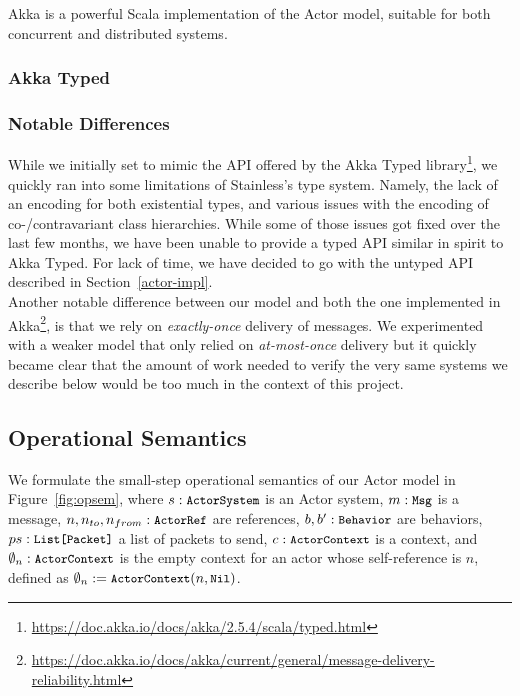 \documentclass[a4paper,twoside]{article}
\newcommand{\RefSec}[1]{Section~\ref{#1}}
\newcommand{\RefFig}[1]{Figure~\ref{#1}}
\newcommand{\stt}[1]{\texttt{\small{#1}}}
\begin{document}
Akka is a powerful Scala implementation of the Actor model, suitable for both concurrent and distributed systems. 

\subsubsection*{Akka Typed}

\subsubsection*{Notable Differences}

While we initially set to mimic the API offered by the Akka Typed library\footnote{\url{https://doc.akka.io/docs/akka/2.5.4/scala/typed.html}}, we quickly ran into some limitations of Stainless's type system. Namely, the lack of an encoding for both existential types, and various issues with the encoding of co-/contravariant class hierarchies. While some of those issues got fixed over the last few months, we have been unable to provide a typed API similar in spirit to Akka Typed. For lack of time, we have decided to go with the untyped API described in \RefSec{actor-impl}.\\

Another notable difference between our model and both the one implemented in Akka\footnote{\url{https://doc.akka.io/docs/akka/current/general/message-delivery-reliability.html}}, is that we rely on \textit{exactly-once} delivery of messages. We experimented with a weaker model that only relied on \textit{at-most-once} delivery but it quickly became clear that the amount of work needed to verify the very same systems we describe below would be too much in the context of this project.


\subsection{Operational Semantics}
\label{semantics}

We formulate the small-step operational semantics of our Actor model in 
\RefFig{fig:opsem}, where $s: \stt{ActorSystem}$ is an Actor system,
$m: \stt{Msg}$ is a message,
$n, n_{to}, n_{from}: \stt{ActorRef}$ are references,
$b, b': \stt{Behavior}$ are behaviors,
$ps: \stt{List[Packet]}$ a list of packets to send,
$c: \stt{ActorContext}$ is a context,
and $\emptyset_n: \stt{ActorContext}$ is the empty context for an actor whose
self-reference is $n$, defined as $\emptyset_n := \stt{ActorContext}(n, \stt{Nil})$.
\end{document}
